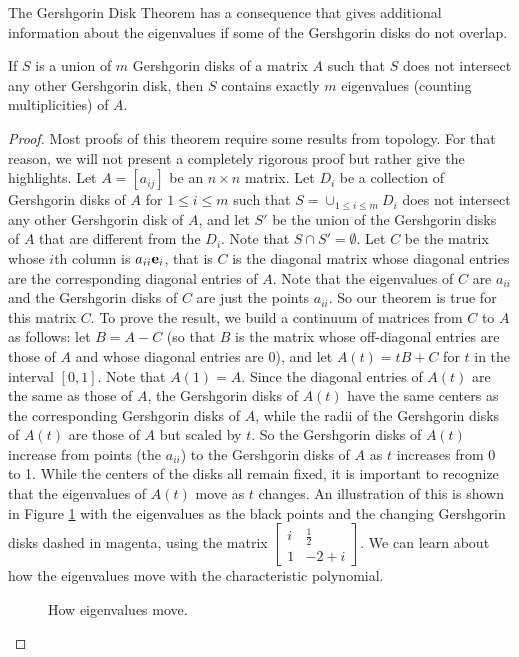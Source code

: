The Gershgorin Disk Theorem has a consequence that gives additional information about the eigenvalues if some of the Gershgorin disks do not overlap. 

\begin{theorem} \label{thm:Gersgorin_consequence} If $S$ is a union of $m$ Gershgorin disks of a matrix $A$ such that $S$ does not intersect any other Gershgorin disk, then $S$ contains exactly $m$ eigenvalues (counting multiplicities) of $A$. 
\end{theorem}

\begin{proof} Most proofs of this theorem require some results from topology. For that reason, we will not present a completely rigorous proof but rather give the highlights. Let $A = [a_{ij}]$ be an $n \times n$ matrix. Let $D_i$ be a collection of Gershgorin disks of $A$ for $1 \leq i \leq m$ such that $S = \cup_{1 \leq i \leq m} D_i$ does not intersect any other Gershgorin disk of $A$, and let $S'$ be the union of the Gershgorin disks of $A$ that are different from the $D_i$. Note that $S \cap S' = \emptyset$.  Let $C$ be the matrix whose $i$th column is $a_{ii}\mathbf{e}_i$, that is $C$ is the diagonal matrix whose diagonal entries are the corresponding diagonal entries of $A$. Note that the eigenvalues of $C$ are $a_{ii}$ and the Gershgorin disks of $C$ are just the points $a_{ii}$. So our theorem is true for this matrix $C$. To prove the result, we build a continuum of matrices from $C$ to $A$ as follows: let $B = A-C$ (so that $B$ is the matrix whose off-diagonal entries are those of $A$ and whose diagonal entries are 0), and let $A(t) = tB + C$ for $t$ in the interval $[0,1]$. Note that $A(1) = A$. Since the diagonal entries of $A(t)$ are the same as those of $A$, the Gershgorin disks of $A(t)$ have the same centers as the corresponding Gershgorin disks of $A$,  while the radii of the Gershgorin disks of $A(t)$ are those of $A$ but scaled by $t$. So the Gershgorin disks of $A(t)$ increase from points (the $a_{ii}$) to the Gershgorin disks of $A$ as $t$ increases from 0 to 1. While the centers of the disks all remain fixed, it is important to recognize that the eigenvalues of $A(t)$ move as $t$ changes. An illustration of this is shown in Figure \ref{F:Gershgorin_2} with the eigenvalues as the black points and the changing Gershgorin disks dashed in magenta, using the matrix $\left[ \begin{array}{cc} i&\frac{1}{2} \\ 1&-2+i \end{array} \right]$. We can learn about how the eigenvalues move with the characteristic polynomial.
\begin{figure}[ht]
\begin{center}
\end{center}
\caption{How eigenvalues move.}
\label{F:Gershgorin_2}
\end{figure}


\end{proof}
